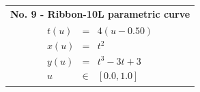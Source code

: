 \begin{table}[ht]
\begin{center}
\begin{tabular}[top]{ |p{16.0 cm}| }
			\hline
		\end{tabular}
		\label{table:Part4of5 Equations and dimensions of the parametric curves}
	\end{center}
\end{table}  

\pagebreak

\begin{table}[ht]
	\begin{center}
		\begin{tabular}[top]{ |p{16.0 cm}| }
			\rowcolor{LIGHTCYAN}			
			
			
			
			
			\hline  \textbf{No. 9 - Ribbon-10L parametric curve}\\
			\begin{eqnarray}
				t(u) & = & 4(u - 0.50) \nonumber \\
				x(u) & = & t^2 \nonumber \\   
				y(u) & = & t^3 - 3t + 3 \nonumber \\
				u & \in & [0.0, 1.0] \nonumber
			\end{eqnarray}
			

\end{tabular}
\end{center}
\end{table}
